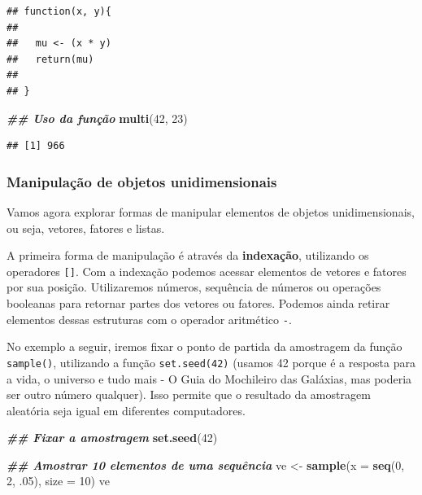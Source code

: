 \documentclass[
]{article}
\newenvironment{Shaded}{\begin{snugshade}}{\end{snugshade}}
\newcommand{\AttributeTok}[1]{\textcolor[rgb]{0.13,0.29,0.53}{#1}}
\newcommand{\DecValTok}[1]{\textcolor[rgb]{0.00,0.00,0.81}{#1}}
\newcommand{\DocumentationTok}[1]{\textcolor[rgb]{0.56,0.35,0.01}{\textbf{\textit{#1}}}}
\newcommand{\FunctionTok}[1]{\textcolor[rgb]{0.13,0.29,0.53}{\textbf{#1}}}
\newcommand{\NormalTok}[1]{#1}
\newcommand{\OtherTok}[1]{\textcolor[rgb]{0.56,0.35,0.01}{#1}}
\begin{document}
\begin{verbatim}
## function(x, y){
##   
##   mu <- (x * y)
##   return(mu)
##  
## }
\end{verbatim}

\begin{Shaded}
\begin{Highlighting}[]
\DocumentationTok{\#\# Uso da função}
\FunctionTok{multi}\NormalTok{(}\DecValTok{42}\NormalTok{, }\DecValTok{23}\NormalTok{)}
\end{Highlighting}
\end{Shaded}

\begin{verbatim}
## [1] 966
\end{verbatim}

\hypertarget{manipulauxe7uxe3o-de-objetos-unidimensionais}{%
\subsubsection{Manipulação de objetos unidimensionais}\label{manipulauxe7uxe3o-de-objetos-unidimensionais}}

Vamos agora explorar formas de manipular elementos de objetos unidimensionais, ou seja, vetores, fatores e listas.

A primeira forma de manipulação é através da \textbf{indexação}, utilizando os operadores \texttt{{[}{]}}. Com a indexação podemos acessar elementos de vetores e fatores por sua posição. Utilizaremos números, sequência de números ou operações booleanas para retornar partes dos vetores ou fatores. Podemos ainda retirar elementos dessas estruturas com o operador aritmético \texttt{-}.

No exemplo a seguir, iremos fixar o ponto de partida da amostragem da função \texttt{sample()}, utilizando a função \texttt{set.seed(42)} (usamos 42 porque é a resposta para a vida, o universo e tudo mais - O Guia do Mochileiro das Galáxias, mas poderia ser outro número qualquer). Isso permite que o resultado da amostragem aleatória seja igual em diferentes computadores.

\begin{Shaded}
\begin{Highlighting}[]
\DocumentationTok{\#\# Fixar a amostragem}
\FunctionTok{set.seed}\NormalTok{(}\DecValTok{42}\NormalTok{)}

\DocumentationTok{\#\# Amostrar 10 elementos de uma sequência}
\NormalTok{ve }\OtherTok{\textless{}{-}} \FunctionTok{sample}\NormalTok{(}\AttributeTok{x =} \FunctionTok{seq}\NormalTok{(}\DecValTok{0}\NormalTok{, }\DecValTok{2}\NormalTok{, .}\DecValTok{05}\NormalTok{), }\AttributeTok{size =} \DecValTok{10}\NormalTok{)}
\NormalTok{ve}
\end{Highlighting}
\end{Shaded}
\end{document}
